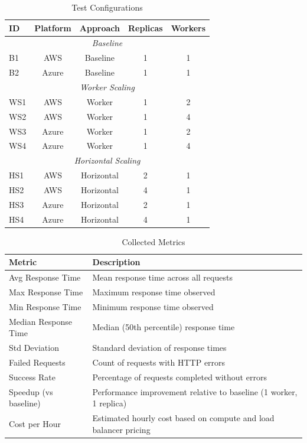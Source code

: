 \begin{table}[!htbp]
\centering
\caption{Test Configurations}
\label{tab:configs}
\begin{tabular}{lcccc}
\toprule
\textbf{ID} & \textbf{Platform} & \textbf{Approach} & \textbf{Replicas} & \textbf{Workers} \\
\midrule
\multicolumn{5}{c}{\textit{Baseline}} \\
\midrule
B1 & AWS & Baseline & 1 & 1 \\
B2 & Azure & Baseline & 1 & 1 \\
\midrule
\multicolumn{5}{c}{\textit{Worker Scaling}} \\
\midrule
WS1 & AWS & Worker & 1 & 2 \\
WS2 & AWS & Worker & 1 & 4 \\
WS3 & Azure & Worker & 1 & 2 \\
WS4 & Azure & Worker & 1 & 4 \\
\midrule
\multicolumn{5}{c}{\textit{Horizontal Scaling}} \\
\midrule
HS1 & AWS & Horizontal & 2 & 1 \\
HS2 & AWS & Horizontal & 4 & 1 \\
HS3 & Azure & Horizontal & 2 & 1 \\
HS4 & Azure & Horizontal & 4 & 1 \\
\bottomrule
\end{tabular}
\end{table}

\begin{table}[!htbp]
\centering
\caption{Collected Metrics}
\label{tab:metrics}
\begin{tabular}{lp{8cm}}
\toprule
\textbf{Metric} & \textbf{Description} \\
\midrule
Avg Response Time & Mean response time across all requests \\
Max Response Time & Maximum response time observed \\
Min Response Time & Minimum response time observed \\
Median Response Time & Median (50th percentile) response time \\
Std Deviation & Standard deviation of response times \\
Failed Requests & Count of requests with HTTP errors \\
Success Rate & Percentage of requests completed without errors \\
Speedup (vs baseline) & Performance improvement relative to baseline (1 worker, 1 replica) \\
Cost per Hour & Estimated hourly cost based on compute and load balancer pricing \\
\bottomrule
\end{tabular}
\end{table}

